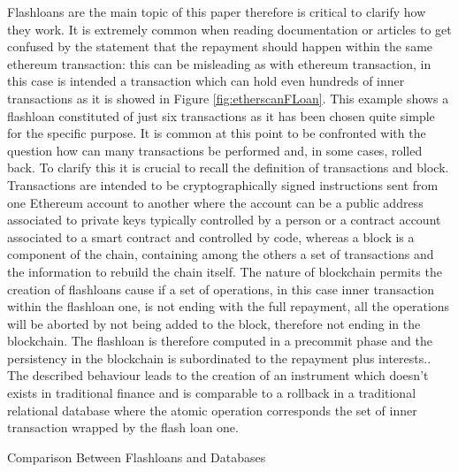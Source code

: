 \documentclass[11pt,a4paper,titlepage]{scrartcl}
\begin{document}
Flashloans are the main topic of this paper therefore is critical to clarify how they work. It is extremely common when reading documentation or articles to get confused by the statement that the repayment should happen within the same ethereum transaction: this can be misleading as with ethereum transaction, in this case is intended a transaction which can hold even hundreds of inner transactions as it is showed in Figure \ref{fig:etherscanFLoan}. This example shows a flashloan constituted of just six transactions as it has been chosen quite simple for the specific purpose.
It is common at this point to be confronted with the question how can many transactions be performed and, in some cases, rolled back.
To clarify this  it is crucial to recall the definition of transactions and block. Transactions are intended to be cryptographically signed instructions sent from one Ethereum account to another where the account can be a public address associated to private keys typically controlled by a person or a contract account associated to a smart contract and controlled by code, whereas a  block  is a component of the chain, containing among the others a set of transactions and the information to rebuild the chain itself. The nature of blockchain permits the creation of flashloans cause if a set of operations, in this case inner transaction within the flashloan one, is not ending with the full repayment, all the operations will be aborted by not being added to the block, therefore not ending in the blockchain. The flashloan is therefore computed in a precommit phase and the persistency in the blockchain is subordinated to the repayment plus interests.. The described behaviour leads to the creation of an instrument which doesn't exists in traditional finance and is comparable to a rollback in a traditional relational database where the atomic operation corresponds the set of inner transaction wrapped by the flash loan one. 

\begin{table}[ht]
\centering
\caption{Comparison Between Flashloans and Databases}
\caption*{\footnotesize Flashloans have no counterpart in traditional finance. The best fit for a comparison is a transactional process in traditional databases.}
\label{tab:flashloans_vs_db}
\end{table}
\end{document}
